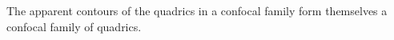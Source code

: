 The apparent contours of the quadrics in a confocal family form themselves a confocal family of quadrics.
